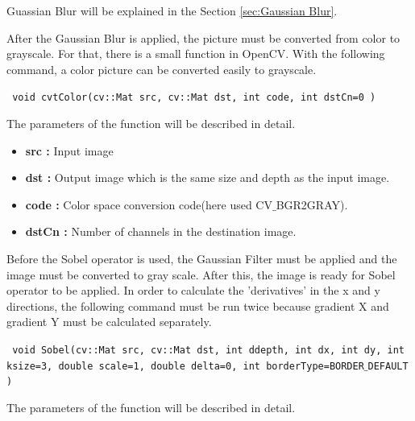 Guassian Blur will be explained in the Section \ref{sec:Gaussian Blur}.


After the Gaussian Blur is applied, the picture must be converted from color to grayscale. For that, there is a small function in OpenCV. With the following command, a color picture can be converted easily to grayscale.

 \begin{center}
 
\texttt{ void cvtColor(cv::Mat src, cv::Mat dst, int code, int dstCn=0 )}

 \end{center}
 
 The parameters of the function will be described in detail.
 
 \begin{itemize}

\item \textbf{src : }Input image
 
\item \textbf{dst : }Output image which is the same size and depth as the input image.

\item \textbf{code : }Color space conversion code(here used CV$ \_ $BGR2GRAY).

\item \textbf{dstCn : }Number of channels in the destination image.


\end{itemize}

Before the Sobel operator is used, the Gaussian Filter must be applied and the image must be converted to gray scale. After this, the image is ready for Sobel operator to be applied. In order to calculate the 'derivatives' in the x and y directions, the following command must be run twice because gradient X and gradient Y must be calculated separately.

 \begin{center}

\texttt{ void Sobel(cv::Mat src, cv::Mat dst, int ddepth, int dx, int dy, int ksize=3, double scale=1, double delta=0, int borderType=BORDER$\_$DEFAULT )}

 \end{center}
 
 The parameters of the function will be described in detail.
 
